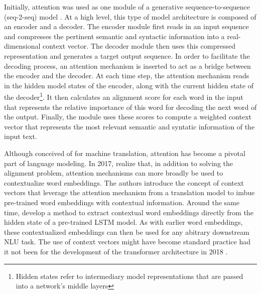 Initially, attention was used as one module of a generative sequence-to-sequence (seq-2-seq) model \citep{sutskever2014sequence}. At a high level, this type of model architecture is composed of an encoder and a decoder. The encoder module first reads in an input sequence and compresses the pertinent semantic and syntactic information into a real-dimensional context vector. The decoder module then uses this compressed representation and generates a target output sequence. In order to facilitate the decoding process, an attention mechanism is inserted to act as a bridge between the encoder and the decoder. At each time step, the attention mechanism reads in the hidden model states of the encoder, along with the current hidden state of the decoder\footnote{Hidden states refer to intermediary model representations that are passed into a network's middle layers}. It then calculates an alignment score for each word in the input that represents the relative importance of this word for decoding the next word of the output. Finally, the module uses these scores to compute a weighted context vector that represents the most relevant semantic and syntatic information of the input text.

Although conceived of for machine translation, attention has become a pivotal part of language modeling. In 2017, \cite{mccann2017learned} realize that, in addition to solving the alignment problem, attention mechanisms can more broadly be used to contextualize word embeddings. The authors introduce the concept of context vectors that leverage the attention mechanism from a translation model to imbue pre-trained word embeddings with contextual information. Around the same time, \cite{peters2018deep} develop a method to extract contextual word embeddings directly from the hidden state of a pre-trained LSTM model. As with earlier word embeddings, these contextualized embeddings can then be used for any abitrary downstream NLU task. The use of context vectors might have become standard practice had it not been for the development of the transformer architecture in 2018 \citep{vaswani2017attention}.

